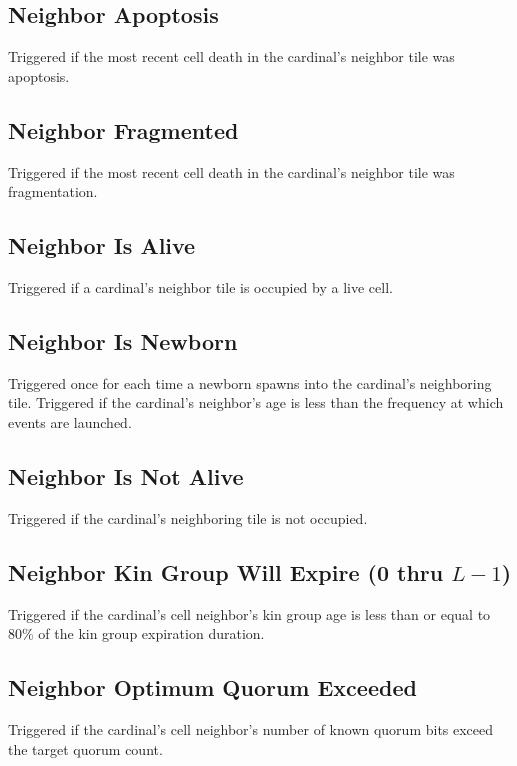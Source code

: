 \subsection{Neighbor Apoptosis}

Triggered if the most recent cell death in the cardinal's neighbor tile was apoptosis.

\subsection{Neighbor Fragmented}

Triggered if the most recent cell death in the cardinal's neighbor tile was fragmentation.

\subsection{Neighbor Is Alive}

Triggered if a cardinal's neighbor tile is occupied by a live cell.

\subsection{Neighbor Is Newborn}

Triggered once for each time a newborn spawns into the cardinal's neighboring tile.
Triggered if the cardinal's neighbor's age is less than the frequency at which events are launched.

\subsection{Neighbor Is Not Alive}

Triggered if the cardinal's neighboring tile is not occupied.

\subsection{Neighbor Kin Group Will Expire (0 thru $L-1$)}

Triggered if the cardinal's cell neighbor's kin group age is less than or equal to 80\% of the kin group expiration duration.

\subsection{Neighbor Optimum Quorum Exceeded}

Triggered if the cardinal's cell neighbor's number of known quorum bits exceed the target quorum count.

